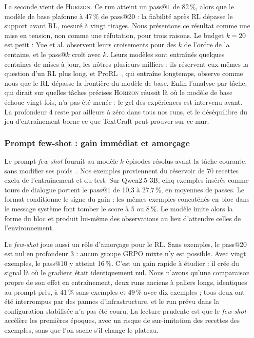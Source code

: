 \documentclass[11pt,a4paper]{article}
\begin{document}
La seconde vient de \textsc{Horizon}. Ce run atteint un pass@$1$ de 82\,\%, alors que le modèle de base plafonne à 47\,\% de pass@20 : la fiabilité après RL dépasse le support avant RL, mesuré à vingt tirages. Nous présentons ce résultat comme une mise en tension, non comme une réfutation, pour trois raisons. Le budget $k=20$ est petit : Yue et al. observent leurs croisements pour des $k$ de l'ordre de la centaine, et le pass@$k$ croît avec $k$. Leurs modèles sont entraînés quelques centaines de mises à jour, les nôtres plusieurs milliers : ils réservent eux-mêmes la question d'un RL plus long, et ProRL~\cite{liu2025prorl}, qui entraîne longtemps, observe comme nous que le RL dépasse la frontière du modèle de base. Enfin l'analyse par tâche, qui dirait sur quelles tâches précises \textsc{Horizon} réussit là où le modèle de base échoue vingt fois, n'a pas été menée : le gel des expériences est intervenu avant. La profondeur 4 reste par ailleurs à zéro dans tous nos runs, et le déséquilibre du jeu d'entraînement borne ce que TextCraft peut prouver sur ce mur.

\subsubsection{Prompt few-shot : gain immédiat et amorçage}

Le prompt \emph{few-shot} fournit au modèle $k$ épisodes résolus avant la tâche courante, sans modifier ses poids~\cite{brown2020gpt3}. Nos exemples proviennent du réservoir de 70 recettes exclu de l'entraînement et du test. Sur Qwen2.5-3B, cinq exemples insérés comme tours de dialogue portent le pass@$1$ de 10{,}3 à 27{,}7\,\%, en moyennes de passes. Le format conditionne le signe du gain : les mêmes exemples concaténés en bloc dans le message système font tomber le score à 5 ou 8\,\%. Le modèle imite alors la forme du bloc et produit lui-même des observations au lieu d'attendre celles de l'environnement.

Le \emph{few-shot} joue aussi un rôle d'amorçage pour le RL. Sans exemples, le pass@20 est nul en profondeur 3 : aucun groupe GRPO mixte n'y est possible. Avec vingt exemples, le pass@10 y atteint 16\,\%. C'est un gain rapide à étudier : il crée du signal là où le gradient était identiquement nul. Nous n'avons qu'une comparaison propre de son effet en entraînement, deux runs anciens à paliers longs, identiques au prompt près, à 41\,\% sans exemples et 49\,\% avec dix exemples ; tous deux ont été interrompus par des pannes d'infrastructure, et le run prévu dans la configuration stabilisée n'a pas été couru. La lecture prudente est que le \emph{few-shot} accélère les premières époques, avec un risque de sur-imitation des recettes des exemples, sans que l'on sache s'il change le plateau.
\end{document}
